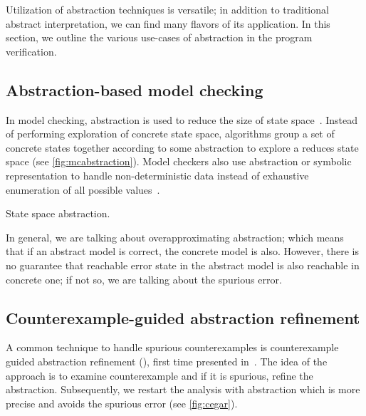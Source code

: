 Utilization of abstraction techniques is versatile; in addition to traditional
abstract interpretation, we can find many flavors of its application. In this
section, we outline the various use-cases of abstraction in the program
verification.

\subsection{Abstraction-based model checking}

In model checking, abstraction is used to reduce the size of state space~\cite{Pelnek2006}.
Instead of performing exploration of concrete state space, algorithms group a
set of concrete states together according to some abstraction to explore a
reduces state space (see \autoref{fig:mcabstraction}). Model checkers also use
abstraction or symbolic representation to handle non-deterministic data instead
of exhaustive enumeration of all possible values~\cite{Mrazek2016}.

\begin{marginfigure}


\caption{State space abstraction.}
\label{fig:mcabstraction}
\end{marginfigure}

In general, we are talking about overapproximating abstraction; which means
that if an abstract model is correct, the concrete model is also. However,
there is no guarantee that reachable error state in the abstract model is also
reachable in concrete one; if not so, we are talking about the spurious error.

\subsection{Counterexample-guided abstraction refinement}

A common technique to handle spurious counterexamples is counterexample guided
abstraction refinement (\cegar), first time presented in~\cite{Clarke2000}.
The idea of the \cegar approach is to examine counterexample and if it is spurious,
refine the abstraction. Subsequently, we restart the analysis with abstraction
which is more precise and avoids the spurious error (see \autoref{fig:cegar}).

